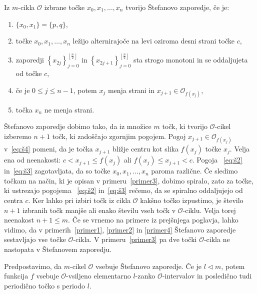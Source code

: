 \documentclass[mat2]{fmfdelo}
\begin{document}
\begin{definicija}\label{def:stef}
Iz $m$-cikla $\mathcal{O}$ izbrane točke $x_0, x_1, \dots, x_n$ tvorijo Štefanovo zaporedje, če je:

\begin{enumerate}[label={(Š\arabic*)}]
    \item $\{x_0, x_1\} = \{p, q\}$, \label{eq:š1}
    \item točke $x_0, x_1, \dots, x_n$ ležijo alternirajoče na levi oziroma desni strani točke $c$, \label{eq:š2}
    \item zaporedji 
    $\left \{ x_{2j} \right \}_{j=0}^{\left \lfloor \frac{n}{2} \right \rfloor}$ 
    in
    $\left \{ x_{2j+1} \right \}_{j=0}^{\left \lfloor \frac{n}{2} \right \rfloor}$ sta strogo monotoni in se oddaljujeta od točke $c$, \label{eq:š3}
    \item če je $0\leq j \leq n-1$, potem $x_j$ menja strani in $x_{j+1} \in \mathcal{O}_{f(x_j)}$,\label{eq:š4}
    \item točka $x_n$ ne menja strani. \label{eq:š5}
\end{enumerate}
\end{definicija}

\begin{opomba}\label{op:štefzap}
Štefanovo zaporedje dobimo tako, da iz množice $m$ točk, ki tvorijo $\mathcal{O}$-cikel izberemo $n+1$ točk, ki zadoščajo zgornjim pogojem. 
Pogoj $x_{j+1} \in \mathcal{O}_{f(x_j)}$ v~\ref{eq:š4} pomeni, da je točka $x_{j+1}$ bližje centru kot slika $f(x_j)$ točke $x_j$. Velja ena od neenakosti: $c < x_{j+1} \leq f(x_j)$ ali $f(x_j) \leq x_{j+1} < c$. Pogoja ~\ref{eq:š2} in~\ref{eq:š3} zagotavljata, da so točke $x_0, x_1, \dots, x_n$ paroma različne. Če sledimo točkam na način, ki je opisan v primeru~\ref{primer3}, dobimo spiralo, zato za točke, ki ustrezajo pogojema ~\ref{eq:š2} in~\ref{eq:š3} rečemo, da se spiralno oddaljujejo od centra $c$. Ker lahko pri izbiri točk iz cikla $\mathcal{O}$ kakšno točko izpustimo, je število $n+1$ izbranih točk manjše ali enako številu vseh točk v $\mathcal{O}$-ciklu. Velja torej neenakost $n+1 \leq m$. Če se vrnemo na primere iz prejšnjega poglavja, lahko vidimo, da v primerih~\ref{primer1}, \ref{primer2} in \ref{primer4} Štefanovo zaporedje sestavljajo vse točke $\mathcal{O}$-cikla. V primeru~\ref{primer3} pa dve točki $\mathcal{O}$-cikla ne nastopata v Štefanovem zaporedju.
\end{opomba}

\begin{trditev}\label{trd:zap-cikel}
Predpostavimo, da $m$-cikel $\mathcal{O}$ vsebuje Štefanovo zaporedje. Če je $l \triangleleft m$, potem funkcija $f$ vsebuje $\mathcal{O}$-vsiljeno elementarno $l$-zanko $\mathcal{O}$-intervalov in posledično tudi periodično točko s periodo $l$.
\end{trditev}
\end{document}
